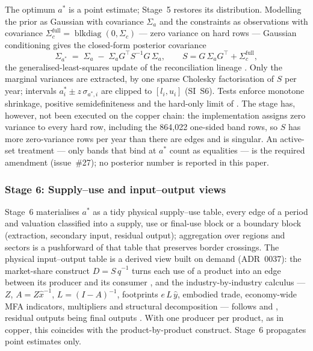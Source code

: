 The optimum $a^*$ is a point estimate; Stage~5 restores its distribution.
Modelling the prior as Gaussian with covariance $\Sigma_a$ and the
constraints as observations with covariance
$\Sigma_c^{\mathrm{full}} = \operatorname{blkdiag}(0, \Sigma_c)$ --- zero
variance on hard rows --- Gaussian conditioning gives the closed-form
posterior covariance
\begin{equation}
\Sigma_{a^*} \;=\; \Sigma_a \;-\; \Sigma_a G^{\top} S^{-1} G\, \Sigma_a,
\qquad S = G\, \Sigma_a G^{\top} + \Sigma_c^{\mathrm{full}},
\label{eq:posterior}
\end{equation}
the generalised-least-squares update of the reconciliation lineage
\citep{byron1978, vanderploeg1982}. Only the marginal variances are
extracted, by one sparse Cholesky factorisation of $S$ per year; intervals
$a^*_i \pm z\,\sigma_{a^*\!,i}$ are clipped to $[l_i, u_i]$ (SI~S6). Tests
enforce monotone shrinkage, positive semidefiniteness and the hard-only
limit of \citet{byron1978}. The stage has, however, not been executed on the
copper chain: the implementation assigns zero variance to every hard row,
including the 864{,}022 one-sided band rows, so $S$ has more zero-variance
rows per year than there are edges and is singular. An active-set treatment
--- only bands that bind at $a^*$ count as equalities --- is the required
amendment (issue~\#27); no posterior number is reported in this paper.

\subsubsection{Stage 6: Supply--use and input--output views}\label{sec:stage6}

Stage~6 materialises $a^*$ as a tidy physical supply--use table, every edge
of a period and valuation classified into a supply, use or final-use block
or a boundary block (extraction, secondary input, residual output);
aggregation over regions and sectors is a pushforward of that table that
preserves border crossings. The physical input--output table is a derived
view built on demand (ADR~0037): the market-share construct $D =
S\,\hat{q}^{-1}$ turns each use of a product into an edge between its
producer and its consumer \citep{millerblair2009}, and the
industry-by-industry calculus --- $Z$, $A = Z\hat{x}^{-1}$, $L = (I-A)^{-1}$,
footprints $e\,L\,\hat{y}$, embodied trade, economy-wide MFA indicators,
multipliers and structural decomposition --- follows \citet{wieland2022piolab}
and \citet{suh2004pio}, residual outputs being final outputs
\citep{altimirasmartin2014piot}. With one producer per product, as in
copper, this coincides with the product-by-product construct. Stage~6
propagates point estimates only.

